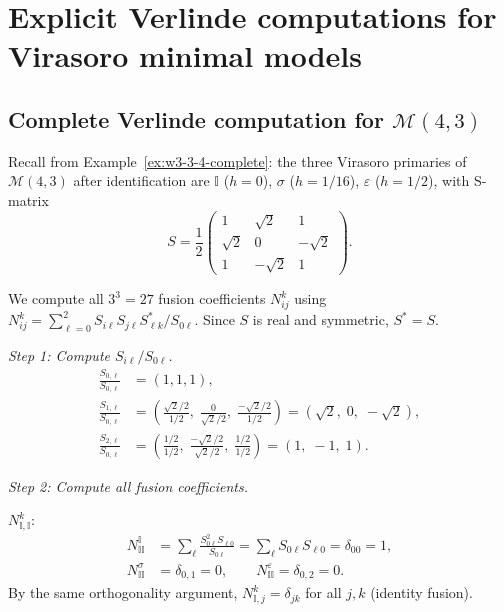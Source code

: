 \section{Explicit Verlinde computations for Virasoro minimal models}
\label{sec:verlinde-computations-explicit}

\subsection{\texorpdfstring{Complete Verlinde computation for $\mathcal{M}(4,3)$}{Complete Verlinde computation for M(4,3)}}
\label{subsec:verlinde-4-3-complete}

\begin{computation}
\label{comp:ising-all-fusion}

Recall from Example~\ref{ex:w3-3-4-complete}: the three Virasoro
primaries of $\mathcal{M}(4,3)$ after identification are
$\mathbb{I}$ ($h=0$), $\sigma$ ($h=1/16$), $\varepsilon$ ($h=1/2$),
with S-matrix
\[
S = \frac{1}{2}\begin{pmatrix}
1 & \sqrt{2} & 1 \\
\sqrt{2} & 0 & -\sqrt{2} \\
1 & -\sqrt{2} & 1
\end{pmatrix}.
\]

We compute all $3^3 = 27$ fusion coefficients $N_{ij}^k$
using $N_{ij}^k = \sum_{\ell=0}^{2}
S_{i\ell}S_{j\ell}S_{\ell k}^*/S_{0\ell}$.
Since $S$ is real and symmetric, $S^* = S$.

\emph{Step 1: Compute $S_{i\ell}/S_{0\ell}$.}
\begin{align*}
\frac{S_{0,\ell}}{S_{0,\ell}} &= (1, 1, 1), \\
\frac{S_{1,\ell}}{S_{0,\ell}} &=
\left(\frac{\sqrt{2}/2}{1/2},\;
\frac{0}{\sqrt{2}/2},\;
\frac{-\sqrt{2}/2}{1/2}\right)
= (\sqrt{2},\; 0,\; -\sqrt{2}), \\
\frac{S_{2,\ell}}{S_{0,\ell}} &=
\left(\frac{1/2}{1/2},\;
\frac{-\sqrt{2}/2}{\sqrt{2}/2},\;
\frac{1/2}{1/2}\right)
= (1,\; -1,\; 1).
\end{align*}

\emph{Step 2: Compute all fusion coefficients.}

$N_{\mathbb{I},\mathbb{I}}^k$:
\begin{align*}
N_{\mathbb{I}\mathbb{I}}^{\mathbb{I}} &=
\sum_\ell \frac{S_{0\ell}^2 S_{\ell 0}}{S_{0\ell}}
= \sum_\ell S_{0\ell} S_{\ell 0}
= \delta_{00} = 1, \\
N_{\mathbb{I}\mathbb{I}}^{\sigma} &= \delta_{0,1} = 0, \qquad
N_{\mathbb{I}\mathbb{I}}^{\varepsilon} = \delta_{0,2} = 0.
\end{align*}
By the same orthogonality argument,
$N_{\mathbb{I},j}^k = \delta_{jk}$ for all $j,k$ (identity fusion).


\end{computation}
